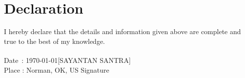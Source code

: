 \documentclass{article}
\begin{document}
\section*{Declaration}
I hereby declare that the details and information given above are complete and true to the best of my knowledge. \\
\vspace{2cm} \\
Date \,: \today \hfill [SAYANTAN SANTRA] \\
Place  : Norman, OK, US \hfill Signature \hspace{1cm} \\
\end{document}
